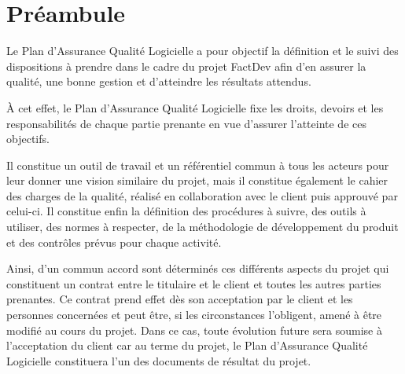 \chapter*{Préambule}

Le Plan d’Assurance Qualité Logicielle a pour objectif la définition et le suivi des dispositions à prendre dans le cadre du projet FactDev afin d’en assurer la qualité, une bonne gestion et d’atteindre les résultats attendus.

À cet effet, le Plan d’Assurance Qualité Logicielle fixe les droits, devoirs et les responsabilités
de chaque partie prenante en vue d’assurer l’atteinte de ces objectifs.

Il constitue un outil de travail et un référentiel commun à tous les acteurs pour leur donner une vision similaire du projet, mais il constitue également le cahier des charges de la qualité, réalisé en collaboration avec le client puis approuvé par celui-ci. Il constitue enfin la définition des procédures à suivre, des outils à utiliser, des normes à respecter, de la méthodologie de développement du produit et des contrôles prévus pour chaque activité.

Ainsi, d’un commun accord sont déterminés ces différents aspects du projet qui constituent un contrat entre le titulaire et le client et toutes les autres parties prenantes. Ce contrat prend effet dès son acceptation par le client et les personnes concernées et peut être, si les circonstances l’obligent, amené à être modifié au cours du projet. Dans ce cas, toute évolution future sera soumise à l'acceptation du client car au terme du projet, le Plan d’Assurance Qualité Logicielle constituera l’un des documents de résultat du projet.
